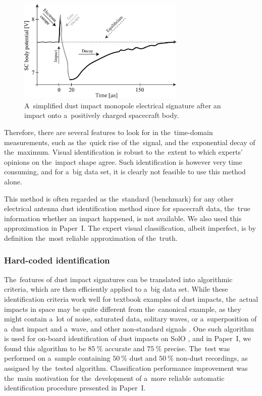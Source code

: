 \begin{figure}[ht]
 	\centering
 	\includegraphics[width=8cm]{figures/impact_wf_gs.pdf}
 	\caption{A~simplified dust impact monopole electrical signature after an impact onto a~positively charged spacecraft body.}
 	\label{fig:impact_process}
\end{figure}

Therefore, there are several features to look for in the~time-domain measurements, such as the~quick rise of the~signal, and the~exponential decay of the~maximum. Visual identification is robust to the~extent to which experts' opinions on the~impact shape agree. Such identification is however very time consuming, and for a~big data set, it is clearly not feasible to use this method alone. 

This method is often regarded as the~standard (benchmark) for any other electrical antenna dust identification method since for spacecraft data, the~true information whether an impact happened, is not available. We also used this approximation in Paper~I. The expert visual classification, albeit imperfect, is by definition the~most reliable approximation of the~truth.

\subsubsection{Hard-coded identification}

The~features of dust impact signatures can be translated into algorithmic criteria, which are then efficiently applied to a~big data set. While these identification criteria work well for textbook examples of dust impacts, the~actual impacts in space may be quite different from the~canonical example, as they might contain a~lot of noise, saturated data, solitary waves, or a~superposition of a~dust impact and a~wave, and other non-standard signals \citep{vaverka2018comparison,ye2019understanding,malaspina2023dust}. One such algorithm is used for on-board identification of dust impacts on SolO \citep{maksimovic2020solar}, and in Paper~I, we found this algorithm to be $\SI{85}{\%}$ accurate and $\SI{75}{\%}$ precise. The~test was performed on a~sample containing $\SI{50}{\%}$ dust and $\SI{50}{\%}$ non-dust recordings, as assigned by the~tested algorithm. Classification performance improvement was the~main motivation for the~development of a~more reliable automatic identification procedure presented in Paper~I. 

